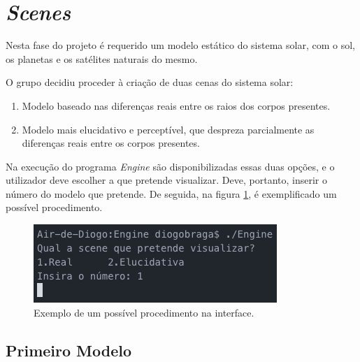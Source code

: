 \documentclass[a4paper]{article}
\begin{document}
\newpage

\section{\textit{Scenes}}

Nesta fase do projeto é requerido um modelo estático do sistema solar, com o sol, os planetas e os satélites naturais do mesmo.

  \vspace{0.5cm}

O grupo decidiu proceder à criação de duas cenas do sistema solar:

\begin{enumerate}
\item Modelo baseado nas diferenças reais entre os raios dos corpos presentes.
\item Modelo mais elucidativo e perceptível, que despreza parcialmente as diferenças reais entre os corpos presentes.
\end{enumerate}

  \vspace{0.5cm}

Na execução do programa \textit{Engine} são disponibilizadas essas duas opções, e o utilizador deve escolher a que pretende visualizar. Deve, portanto, inserir o número do modelo que pretende. De seguida, na figura \ref{img:interface}, é exemplificado um possível procedimento.

\begin{figure}[H]
\centering
\includegraphics[scale=0.5]{interface.png}
\caption{Exemplo de um possível procedimento na interface.}
\label{img:interface}
\end{figure}


\newpage

\subsection{Primeiro Modelo}
\end{document}
